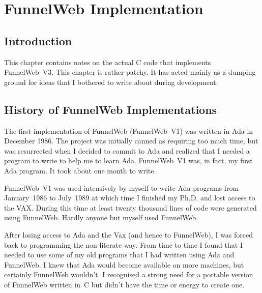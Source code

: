 %
%

\chapter{FunnelWeb Implementation}
\label{chapimplementation}

\section{Introduction}

This chapter contains notes on the actual C code that implements
FunnelWeb~V3. This chapter is rather patchy. It has acted mainly as
a dumping ground for ideas that I bothered to write about during
development.

\section{History of FunnelWeb Implementations}
%

The first implementation of FunnelWeb (FunnelWeb~V1) was written in
Ada
in December 1986. The project was initially canned as requiring too
much time, but was resurrected when I decided to commit to
Ada and
realized that I needed a program to write to help me to learn Ada.
FunnelWeb~V1 was, in fact, my first Ada program. It took about one
month to write.

FunnelWeb~V1 was used intensively by myself to write Ada programs
from January~1986 to July~1989 at which time
I finished my Ph.D. and lost access to
the VAX. During this time at least twenty thousand lines of code were generated
using FunnelWeb. Hardly anyone but myself used
FunnelWeb.

After losing access to Ada and the Vax (and hence to FunnelWeb), I was forced
back to programming the non-literate way. From time to time I found that I
needed to use some of my old programs that I had written using Ada and
FunnelWeb. I knew that Ada would become available on more machines, but
certainly FunnelWeb wouldn't. I recognised a strong need for a portable
version of FunnelWeb written in~C but didn't have the time or energy
to create one.

